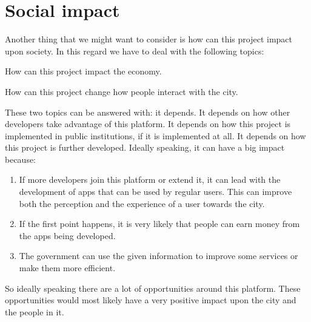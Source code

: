  
\section{Social impact}

Another thing that we might want to consider is how can this project impact
upon society. In this regard we have to deal with the following topics:

\mylist
  \item How can this project impact the economy.
  \item How can this project change how people interact with the city.
\mylistend

These two topics can be answered with: it depends. It depends on how other
developers take advantage of this platform. It depends on how this project is
implemented in public institutions, if it is implemented at all. It depends on
how this project is further developed. Ideally speaking, it can have a big
impact because:

\begin{enumerate}
  \itemsep0em
  \item If more developers join this platform or extend it, it can lead with
the development of apps that can be used by regular users. This can improve
both the perception and the experience of a user towards the city.
  \item If the first point happens, it is very likely that people can earn
money from the apps being developed.
  \item The government can use the given information to improve some services
or make them more efficient.
\end{enumerate}

So ideally speaking there are a lot of opportunities around this platform.
These opportunities would most likely have a very positive impact upon the city
and the people in it.
